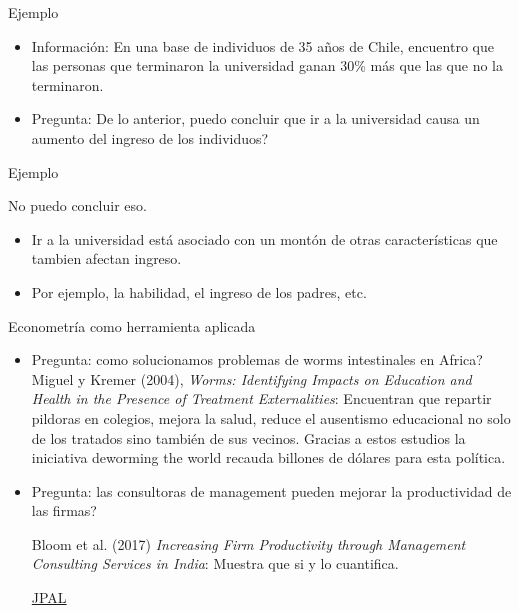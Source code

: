 \documentclass{beamer}
\begin{document}
\begin{frame}{Ejemplo}
\begin{itemize}
\item  Informaci\'on: En una base de individuos de 35 años de Chile, encuentro que las
personas que terminaron la universidad ganan 30\% m\'as que las que no la terminaron.

 \item Pregunta: De lo anterior, puedo concluir que ir a la universidad causa un
aumento del ingreso de los individuos?   
\end{itemize}
\end{frame}


\begin{frame}{Ejemplo}

No puedo concluir eso. 
\begin{itemize}
    \item Ir a la universidad est\'a asociado con un mont\'on de otras caracter\'isticas que
tambien afectan ingreso.
\item Por ejemplo, la habilidad, el ingreso de los padres, etc. 
\end{itemize}
    
\end{frame}


\begin{frame}{Econometr\'ia como herramienta aplicada}

\begin{itemize}
    \item {\color{blue}Pregunta: como solucionamos problemas de worms intestinales en Africa?}\\
 Miguel y Kremer (2004), {\it Worms: Identifying Impacts on Education and Health in the Presence of Treatment Externalities}: Encuentran que repartir pildoras en colegios, mejora la
salud, reduce el ausentismo educacional no solo de los tratados sino también de sus vecinos. Gracias a estos estudios la
iniciativa deworming the world recauda billones de d\'olares para esta pol\'itica.
\item {\color{blue} Pregunta: las consultoras de management pueden mejorar la productividad de
las firmas?}

Bloom et al. (2017) {\it Increasing Firm Productivity through Management Consulting
Services in India}: Muestra que si y lo cuantifica.

\href{https://www.povertyactionlab.org/evaluation/increasing-firm-productivity-through-management-consulting-services-india}{
{\color{blue}JPAL}}
\end{itemize}
    \end{frame}
\end{document}
